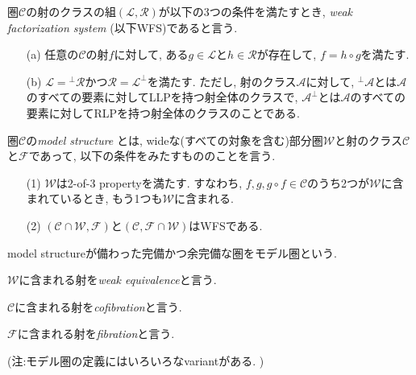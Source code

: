 \documentclass[. /main]{subfiles}
\begin{document}
\begin{momodefi}
圏$\mathcal{C}$の射のクラスの組$(\mathcal{L},  \mathcal{R})$が以下の3つの条件を満たすとき, {\it weak factorization system} (以下WFS)であると言う. 
\begin{itemize}
\item[(a)] 任意の$\mathcal{C}$の射$f$に対して, ある$g \in \mathcal{L}$と$h \in \mathcal{R}$が存在して, $f = h \circ g$を満たす.
\item[(b)] $\mathcal{L} = {}^{\perp}\mathcal{R}$かつ$\mathcal{R
} = {\mathcal{L}}^{\perp}$を満たす. ただし, 射のクラス$\mathcal{A}$に対して, ${}^{\perp}\mathcal{A}$とは$\mathcal{A}$のすべての要素に対してLLPを持つ射全体のクラスで, ${\mathcal{A}}^{\perp}$とは$\mathcal{A}$のすべての要素に対してRLPを持つ射全体のクラスのことである. 
\end{itemize}
\end{momodefi}

\begin{momodefi}[モデル圏]
圏$\mathcal{C}$の{\it model structure} とは, wideな(すべての対象を含む)部分圏$\mathcal{W}$と射のクラス$\mathcal{C}$と$\mathcal{F}$であって, 以下の条件をみたすもののことを言う. 
\begin{itemize}
\item[(1)] $\mathcal{W}$は2-of-3 propertyを満たす. すなわち, $f,  g,  g \circ f \in \mathcal{C}$のうち2つが$\mathcal{W}$に含まれているとき, もう1つも$\mathcal{W}$に含まれる. 
\item[(2)] $(\mathcal{C} \cap \mathcal{W},  \mathcal{F})$と$(\mathcal{C},  \mathcal{F} \cap \mathcal{W})$はWFSである. 
\end{itemize}

model structureが備わった完備かつ余完備な圏をモデル圏という. 

$\mathcal{W}$に含まれる射を{\it weak equivalence}と言う. 

$\mathcal{C}$に含まれる射を{\it cofibration}と言う. 

$\mathcal{F}$に含まれる射を{\it fibration}と言う. 

(注:モデル圏の定義にはいろいろなvariantがある. )
\end{momodefi}
\end{document}
